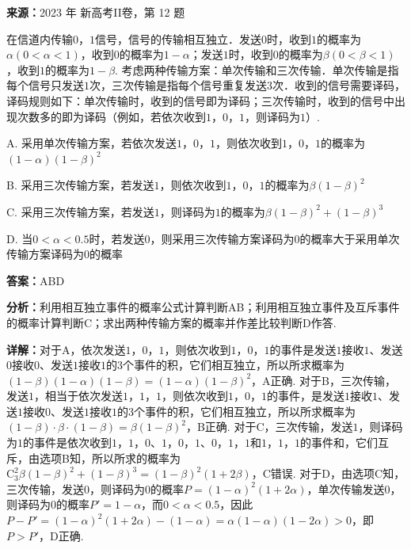 \begin{question}[points=5]
\textbf{来源：}2023 年 新高考II卷，第 12 题\par
在信道内传输$0$，$1$信号，信号的传输相互独立．发送$0$时，收到$1$的概率为$\alpha(0<\alpha<1)$，收到$0$的概率为$1-\alpha$；发送$1$时，收到$0$的概率为$\beta(0<\beta<1)$，收到$1$的概率为$1-\beta$. 考虑两种传输方案：单次传输和三次传输．单次传输是指每个信号只发送$1$次，三次传输是指每个信号重复发送$3$次．收到的信号需要译码，译码规则如下：单次传输时，收到的信号即为译码；三次传输时，收到的信号中出现次数多的即为译码（例如，若依次收到$1$，$0$，$1$，则译码为$1$）.
\begin{choices}
  \item A. 采用单次传输方案，若依次发送$1$，$0$，$1$，则依次收到$1$，$0$，$1$的概率为$(1-\alpha)(1-\beta)^{2}$
  \item B. 采用三次传输方案，若发送$1$，则依次收到$1$，$0$，$1$的概率为$\beta(1-\beta)^{2}$
  \item C. 采用三次传输方案，若发送$1$，则译码为$1$的概率为$\beta(1-\beta)^{2}+(1-\beta)^{3}$
  \item D. 当$0<\alpha<0.5$时，若发送$0$，则采用三次传输方案译码为$0$的概率大于采用单次传输方案译码为$0$的概率
\end{choices}
\begin{solution}
\textbf{答案：}ABD

\textbf{分析：}利用相互独立事件的概率公式计算判断AB；利用相互独立事件及互斥事件的概率计算判断C；求出两种传输方案的概率并作差比较判断D作答.

\textbf{详解：}对于A，依次发送$1$，$0$，$1$，则依次收到$1$，$0$，$1$的事件是发送$1$接收$1$、发送$0$接收$0$、发送$1$接收$1$的3个事件的积，它们相互独立，所以所求概率为$(1-\beta)(1-\alpha)(1-\beta)=(1-\alpha)(1-\beta)^{2}$，A正确.
对于B，三次传输，发送$1$，相当于依次发送$1$，$1$，$1$，则依次收到$1$，$0$，$1$的事件，是发送$1$接收$1$、发送$1$接收$0$、发送$1$接收$1$的3个事件的积，它们相互独立，所以所求概率为$(1-\beta)\cdot\beta\cdot(1-\beta)=\beta(1-\beta)^{2}$，B正确.
对于C，三次传输，发送$1$，则译码为$1$的事件是依次收到$1$，$1$，$0$、$1$，$0$，$1$、$0$，$1$，$1$和$1$，$1$，$1$的事件和，它们互斥，由选项B知，所以所求的概率为$\mathrm{C}_{3}^{2}\beta(1-\beta)^{2}+(1-\beta)^{3}=(1-\beta)^{2}(1+2\beta)$，C错误.
对于D，由选项C知，三次传输，发送$0$，则译码为$0$的概率$P=(1-\alpha)^{2}(1+2\alpha)$，单次传输发送$0$，则译码为$0$的概率$P'=1-\alpha$，而$0<\alpha<0.5$，因此$P-P'=(1-\alpha)^{2}(1+2\alpha)-(1-\alpha)=\alpha(1-\alpha)(1-2\alpha)>0$，即$P>P'$，D正确.
\end{solution}
\end{question}

